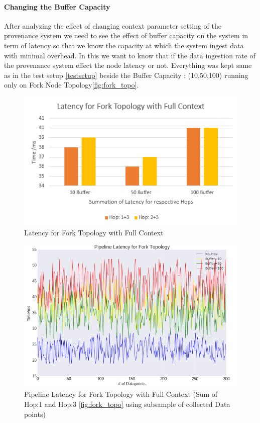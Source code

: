 \paragraph*{Changing the Buffer Capacity}
After analyzing the effect of changing context parameter setting of the provenance system we need to see the effect of buffer capacity on the system in term of latency so that we know the capacity at which the system ingest data with minimal overhead. In this we want to know that if the data ingestion rate of the provenance system effect the node latency or not.
Everything was kept same as in the test setup \ref{testsetup} beside the Buffer Capacity : (10,50,100) running only on Fork Node Topology\ref{fig:fork_topo}.

\begin{figure}[H]
	\center
	\includegraphics[width=\textwidth]{figures/buffer-fork.PNG}
	\caption{Latency for Fork Topology with Full Context}
	\label{fig:forktopo_latency_buffer_bar}
\end{figure}

\begin{figure}[H]
	\center
	\includegraphics[width=\textwidth]{figures/pipeline_buffer.png}
	\caption{Pipeline Latency for Fork Topology with Full Context (Sum of Hop:1 and Hop:3 \ref{fig:fork_topo} using subsample of collected Data points)}
	\label{fig:forktopo_latency_buffer}
\end{figure}


